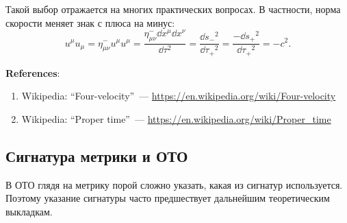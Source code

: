 \documentclass[\docroot/reports/draft/report.tex]{subfiles}
\begin{document}
    Такой выбор отражается на многих практических вопросах. В частности, норма скорости меняет знак с плюса на минус:
    \begin{equation*}
        u^\mu u_\mu = \eta^-_{\mu\nu} u^\mu u^\mu
                    = \frac{\eta^-_{\mu\nu} \dd{x^\mu}\dd{x^\nu}}{\dd{\tau}^2}
                    = \frac{\dd{s_-}^2}{\dd{\tau_+}^2}
                    = \frac{- \dd{s_+}^2}{\dd{\tau_+}^2}
                    = - c^2 .
    \end{equation*}

    \vspace{1cm}

    \textbf{\Large{References}}:
    \begin{enumerate}
        \item Wikipedia: \enquote{Four-velocity}~--- \url{https://en.wikipedia.org/wiki/Four-velocity}
        \item Wikipedia: \enquote{Proper time}~--- \url{https://en.wikipedia.org/wiki/Proper_time}
    \end{enumerate}

\subsection{Сигнатура метрики и ОТО}

    В ОТО глядя на метрику порой сложно указать, какая из сигнатур используется. Поэтому указание сигнатуры часто предшествует дальнейшим теоретическим выкладкам.

\end{document}
